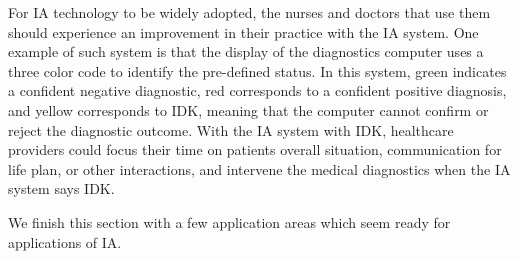 \documentclass[11pt]{pnas-new}
\begin{document}
  For IA technology to be widely adopted, the nurses and doctors that
  use them should experience an improvement in their practice {\color{blue}with the IA system. One example of such system is}
  that the display of the diagnostics computer uses a three color code
  to identify {\color{blue}the pre-defined status. In this system,} green indicates a confident
  negative diagnostic, red corresponds to a confident positive
  diagnosis, and yellow corresponds to IDK, meaning that the
  computer cannot confirm or reject the diagnostic outcome. {\color{blue}%
  With the IA system with IDK, healthcare providers could focus their time on patients overall situation, communication for life plan, or other interactions, and intervene the medical diagnostics when the IA system says IDK.}



  
  We finish this section with a few application areas which seem ready
  for applications of IA.
  
\end{document}
